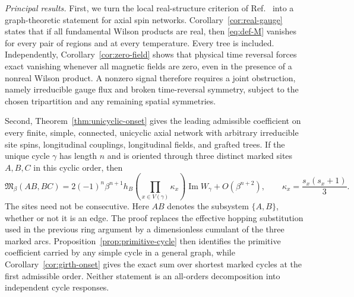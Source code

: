 \documentclass[aps,prb,preprint,nofootinbib,longbibliography]{revtex4-2}
\newcommand{\Mmod}{\mathfrak{M}}
\begin{document}
\textit{Principal results.}  First, we turn the local real-structure criterion
of Ref.~\cite{KimEtAl2022PRB} into a graph-theoretic statement for axial spin
networks.  Corollary~\ref{cor:real-gauge} states that if all fundamental Wilson
products are real, then \eqref{eq:def-M} vanishes for every pair of regions and
at every temperature.  Every tree is included.  Independently,
Corollary~\ref{cor:zero-field} shows that physical time reversal forces exact
vanishing whenever all magnetic fields are zero, even in the presence of a
nonreal Wilson product.  A nonzero signal therefore requires a joint
obstruction, namely irreducible gauge flux and broken time-reversal symmetry,
subject
to the chosen tripartition and any remaining spatial symmetries.

Second, Theorem~\ref{thm:unicyclic-onset} gives the leading admissible
coefficient on every finite, simple, connected, unicyclic axial network with
arbitrary irreducible site spins, longitudinal couplings, longitudinal fields,
and grafted trees.  If the unique cycle $\gamma$ has length $n$ and is
oriented through three distinct marked sites $A,B,C$ in this cyclic order,
then
\begin{equation}
 \Mmod_\beta(AB,BC)
 =2(-1)^n\beta^{n+1}h_B
 \left(\prod_{x\in V(\gamma)}\kappa_x\right)
 \operatorname{Im}W_\gamma+O(\beta^{n+2}),
 \qquad
 \kappa_x=\frac{s_x(s_x+1)}3.
 \label{eq:intro-unicyclic}
\end{equation}
The sites need not be consecutive.  Here $AB$ denotes the subsystem
$\{A,B\}$, whether or not it is an edge.  The proof replaces the effective
hopping substitution used in the previous ring argument by a dimensionless
cumulant of the three marked arcs.  Proposition~\ref{prop:primitive-cycle}
then identifies the primitive coefficient carried by any simple cycle in a
general graph, while Corollary~\ref{cor:girth-onset} gives the exact sum over
shortest marked cycles at the first admissible order.  Neither statement is
an all-orders decomposition into independent cycle responses.
\end{document}
